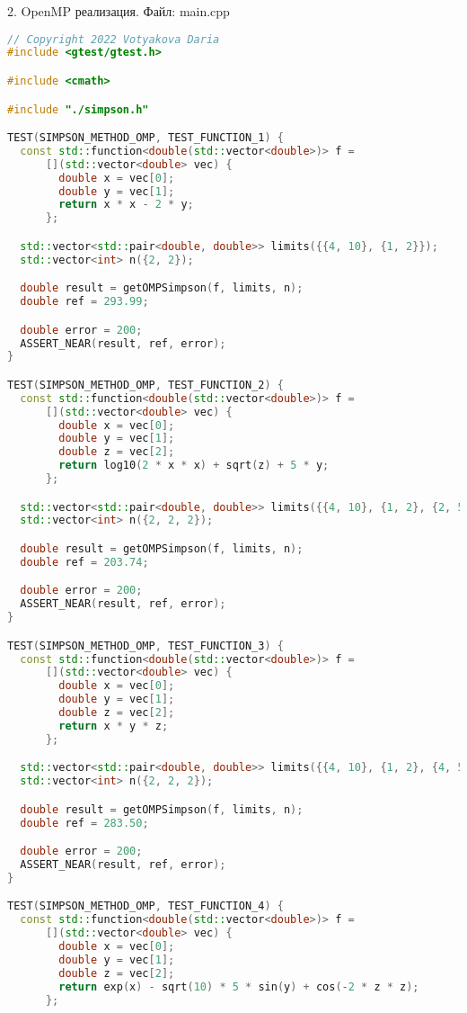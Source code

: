 \documentclass{report}
\begin{document}
\par 2. OpenMP реализация. Файл: main.cpp

\begin{lstlisting}[language=C++]
// Copyright 2022 Votyakova Daria
#include <gtest/gtest.h>

#include <cmath>

#include "./simpson.h"

TEST(SIMPSON_METHOD_OMP, TEST_FUNCTION_1) {
  const std::function<double(std::vector<double>)> f =
      [](std::vector<double> vec) {
        double x = vec[0];
        double y = vec[1];
        return x * x - 2 * y;
      };

  std::vector<std::pair<double, double>> limits({{4, 10}, {1, 2}});
  std::vector<int> n({2, 2});

  double result = getOMPSimpson(f, limits, n);
  double ref = 293.99;

  double error = 200;
  ASSERT_NEAR(result, ref, error);
}

TEST(SIMPSON_METHOD_OMP, TEST_FUNCTION_2) {
  const std::function<double(std::vector<double>)> f =
      [](std::vector<double> vec) {
        double x = vec[0];
        double y = vec[1];
        double z = vec[2];
        return log10(2 * x * x) + sqrt(z) + 5 * y;
      };

  std::vector<std::pair<double, double>> limits({{4, 10}, {1, 2}, {2, 5}});
  std::vector<int> n({2, 2, 2});

  double result = getOMPSimpson(f, limits, n);
  double ref = 203.74;

  double error = 200;
  ASSERT_NEAR(result, ref, error);
}

TEST(SIMPSON_METHOD_OMP, TEST_FUNCTION_3) {
  const std::function<double(std::vector<double>)> f =
      [](std::vector<double> vec) {
        double x = vec[0];
        double y = vec[1];
        double z = vec[2];
        return x * y * z;
      };

  std::vector<std::pair<double, double>> limits({{4, 10}, {1, 2}, {4, 5}});
  std::vector<int> n({2, 2, 2});

  double result = getOMPSimpson(f, limits, n);
  double ref = 283.50;

  double error = 200;
  ASSERT_NEAR(result, ref, error);
}

TEST(SIMPSON_METHOD_OMP, TEST_FUNCTION_4) {
  const std::function<double(std::vector<double>)> f =
      [](std::vector<double> vec) {
        double x = vec[0];
        double y = vec[1];
        double z = vec[2];
        return exp(x) - sqrt(10) * 5 * sin(y) + cos(-2 * z * z);
      };


\end{lstlisting}
\end{document}
